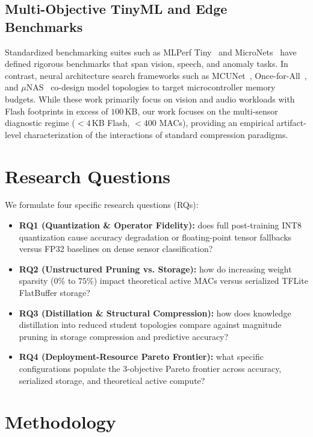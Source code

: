 \documentclass[journal,10pt]{IEEEtran}
\begin{document}
\subsection{Multi-Objective TinyML and Edge Benchmarks}
Standardized benchmarking suites such as MLPerf Tiny~\cite{banbury2021benchmarking} and MicroNets~\cite{banbury2021micronets} have defined rigorous benchmarks that span vision, speech, and anomaly tasks. In contrast, neural architecture search frameworks such as MCUNet~\cite{lin2020mcunet,lin2021mcunetv2}, Once-for-All~\cite{cai2020once}, and $\mu$NAS~\cite{liberis2021munas} co-design model topologies to target microcontroller memory budgets. While these work primarily focus on vision and audio workloads with Flash footprints in excess of $100$\,KB, our work focuses on the multi-sensor diagnostic regime ($<4$\,KB Flash, $<400$ MACs), providing an empirical artifact-level characterization of the interactions of standard compression paradigms.

\section{Research Questions}
We formulate four specific research questions (RQs):
\begin{itemize}
    \item \textbf{RQ1 (Quantization \& Operator Fidelity):} does full post-training INT8 quantization cause accuracy degradation or floating-point tensor fallbacks versus FP32 baselines on dense sensor classification?
    \item \textbf{RQ2 (Unstructured Pruning vs. Storage):} how do increasing weight sparsity ($0\%$ to $75\%$) impact theoretical active MACs versus serialized TFLite FlatBuffer storage?
    \item \textbf{RQ3 (Distillation \& Structural Compression):} how does knowledge distillation into reduced student topologies compare against magnitude pruning in storage compression and predictive accuracy?
    \item \textbf{RQ4 (Deployment-Resource Pareto Frontier):} what specific configurations populate the 3-objective Pareto frontier across accuracy, serialized storage, and theoretical active compute?
\end{itemize}

\section{Methodology}
\end{document}
